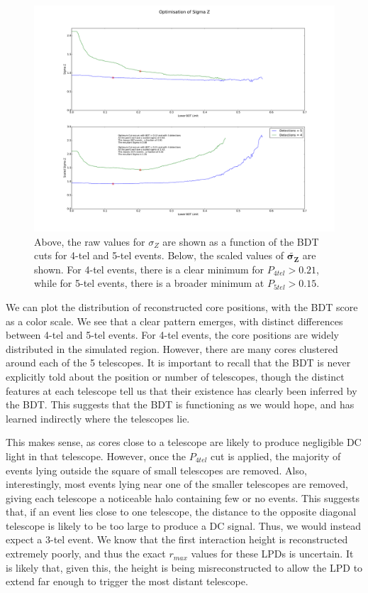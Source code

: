 \documentclass[11pt]{article}
\begin{document}
\begin{figure}
\begin{center}
\includegraphics[width=\textwidth]{Zcuts}
\caption{Above, the raw values for $\sigma_{Z}$ are shown as a function of the BDT cuts for 4-tel and 5-tel events. Below, the scaled values of $\mathbf{\tilde{\sigma_{Z}}}$ are shown. For 4-tel events, there is a clear minimum for $P_{4tel} > 0.21$, while for 5-tel events, there is a broader minimum at $P_{5tel} > 0.15$.}
\label{fig:Zcuts}
\end{center}
\end{figure}

We can plot the distribution of reconstructed core positions, with the BDT score as a color scale. We see that a clear pattern emerges, with distinct differences between 4-tel and 5-tel events. For 4-tel events, the core positions are widely distributed in the simulated region. However, there are many cores clustered around each of the 5 telescopes. It is important to recall that the BDT is never explicitly told about the position or number of telescopes, though the distinct features at each telescope tell us that their existence has clearly been inferred by the BDT. This suggests that the BDT is functioning as we would hope, and has learned indirectly where the telescopes lie. 

This makes sense, as cores close to a telescope are likely to produce negligible DC light in that telescope. However, once the $P_{4tel}$ cut is applied, the majority of events lying outside the square of small telescopes are removed. Also, interestingly, most events lying near one of the smaller telescopes are removed, giving each telescope a noticeable halo containing few or no events. This suggests that, if an event lies close to one telescope, the distance to the opposite diagonal telescope is likely to be too large to produce a DC signal. Thus, we would instead expect a 3-tel event. We know that the first interaction height is reconstructed extremely poorly, and thus the exact $r_{max}$ values for these LPDs is uncertain. It is likely that, given this, the height is being misreconstructed to allow the LPD to extend far enough to trigger the most distant telescope.
\end{document}

